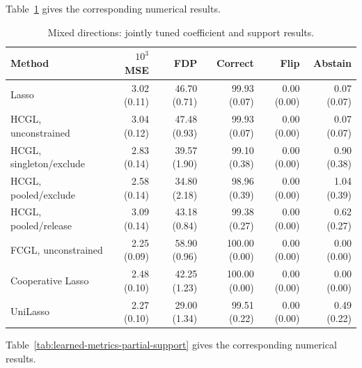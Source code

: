 \documentclass[11pt,a4paper]{article}
\begin{document}
\noindent Table~\ref{tab:learned-metrics-mixed-directions} gives the corresponding numerical results.

\begin{table}[htbp]
\centering\small\setlength{\tabcolsep}{3pt}
\caption{Mixed directions: jointly tuned coefficient and support results.}
\label{tab:learned-metrics-mixed-directions}
\begin{tabular}{lrrrrr}\toprule
Method & $10^3$ MSE & FDP & Correct & Flip & Abstain\\\midrule
Lasso & 3.02 (0.11) & 46.70 (0.71) & 99.93 (0.07) & 0.00 (0.00) & 0.07 (0.07) \\
HCGL, unconstrained & 3.04 (0.12) & 47.48 (0.93) & 99.93 (0.07) & 0.00 (0.00) & 0.07 (0.07) \\
HCGL, singleton/exclude & 2.83 (0.14) & 39.57 (1.90) & 99.10 (0.38) & 0.00 (0.00) & 0.90 (0.38) \\
HCGL, pooled/exclude & 2.58 (0.14) & 34.80 (2.18) & 98.96 (0.39) & 0.00 (0.00) & 1.04 (0.39) \\
HCGL, pooled/release & 3.09 (0.14) & 43.18 (0.84) & 99.38 (0.27) & 0.00 (0.00) & 0.62 (0.27) \\
FCGL, unconstrained & 2.25 (0.09) & 58.90 (0.96) & 100.00 (0.00) & 0.00 (0.00) & 0.00 (0.00) \\
Cooperative Lasso & 2.48 (0.10) & 42.25 (1.23) & 100.00 (0.00) & 0.00 (0.00) & 0.00 (0.00) \\
UniLasso & 2.27 (0.10) & 29.00 (1.34) & 99.51 (0.22) & 0.00 (0.00) & 0.49 (0.22) \\
\bottomrule\end{tabular}
\end{table}

\noindent Table~\ref{tab:learned-metrics-partial-support} gives the corresponding numerical results.
\end{document}
